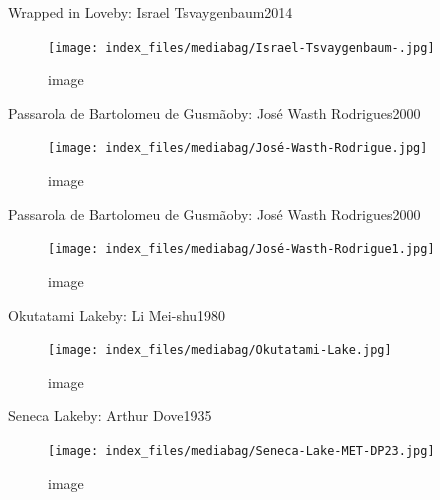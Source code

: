 \documentclass[
  a4paper,
]{book}
\begin{document}
\label{http:ux2fux2fwww.wikidata.orgux2fentityux2fQ105576317}
Wrapped in Loveby: Israel Tsvaygenbaum2014

\begin{figure}[H]

{\centering \texttt{[image: index\_files/mediabag/Israel-Tsvaygenbaum-.jpg]}

}

\caption{image}

\end{figure}%

\label{http:ux2fux2fwww.wikidata.orgux2fentityux2fQ55852280}
Passarola de Bartolomeu de Gusmãoby: José Wasth Rodrigues2000

\begin{figure}[H]

{\centering \texttt{[image: index\_files/mediabag/José-Wasth-Rodrigue.jpg]}

}

\caption{image}

\end{figure}%

\label{http:ux2fux2fwww.wikidata.orgux2fentityux2fQ55852494}
Passarola de Bartolomeu de Gusmãoby: José Wasth Rodrigues2000

\begin{figure}[H]

{\centering \texttt{[image: index\_files/mediabag/José-Wasth-Rodrigue1.jpg]}

}

\caption{image}

\end{figure}%

\label{http:ux2fux2fwww.wikidata.orgux2fentityux2fQ56807932}
Okutatami Lakeby: Li Mei-shu1980

\begin{figure}[H]

{\centering \texttt{[image: index\_files/mediabag/Okutatami-Lake.jpg]}

}

\caption{image}

\end{figure}%

\label{http:ux2fux2fwww.wikidata.orgux2fentityux2fQ19917454}
Seneca Lakeby: Arthur Dove1935

\begin{figure}[H]

{\centering \texttt{[image: index\_files/mediabag/Seneca-Lake-MET-DP23.jpg]}

}

\caption{image}

\end{figure}%
\end{document}
